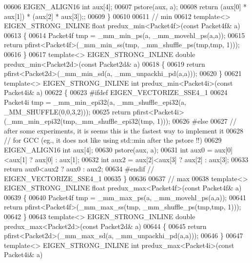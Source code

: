 \begin{DoxyCode}
00606   EIGEN\_ALIGN16 \textcolor{keywordtype}{int} aux[4];
00607   pstore(aux, a);
00608   \textcolor{keywordflow}{return}  (aux[0] * aux[1]) * (aux[2] * aux[3]);;
00609 \}
00610 
00611 \textcolor{comment}{// min}
00612 \textcolor{keyword}{template}<> EIGEN\_STRONG\_INLINE \textcolor{keywordtype}{float} predux\_min<Packet4f>(\textcolor{keyword}{const} Packet4f& a)
00613 \{
00614   Packet4f tmp = \_mm\_min\_ps(a, \_mm\_movehl\_ps(a,a));
00615   \textcolor{keywordflow}{return} pfirst<Packet4f>(\_mm\_min\_ss(tmp, \_mm\_shuffle\_ps(tmp,tmp, 1)));
00616 \}
00617 \textcolor{keyword}{template}<> EIGEN\_STRONG\_INLINE \textcolor{keywordtype}{double} predux\_min<Packet2d>(\textcolor{keyword}{const} Packet2d& a)
00618 \{
00619   \textcolor{keywordflow}{return} pfirst<Packet2d>(\_mm\_min\_sd(a, \_mm\_unpackhi\_pd(a,a)));
00620 \}
00621 \textcolor{keyword}{template}<> EIGEN\_STRONG\_INLINE \textcolor{keywordtype}{int} predux\_min<Packet4i>(\textcolor{keyword}{const} Packet4i& a)
00622 \{
00623 \textcolor{preprocessor}{#ifdef EIGEN\_VECTORIZE\_SSE4\_1}
00624   Packet4i tmp = \_mm\_min\_epi32(a, \_mm\_shuffle\_epi32(a, \_MM\_SHUFFLE(0,0,3,2)));
00625   \textcolor{keywordflow}{return} pfirst<Packet4i>(\_mm\_min\_epi32(tmp,\_mm\_shuffle\_epi32(tmp, 1)));
00626 \textcolor{preprocessor}{#else}
00627   \textcolor{comment}{// after some experiments, it is seems this is the fastest way to implement it}
00628   \textcolor{comment}{// for GCC (eg., it does not like using std::min after the pstore !!)}
00629   EIGEN\_ALIGN16 \textcolor{keywordtype}{int} aux[4];
00630   pstore(aux, a);
00631   \textcolor{keywordtype}{int} aux0 = aux[0]<aux[1] ? aux[0] : aux[1];
00632   \textcolor{keywordtype}{int} aux2 = aux[2]<aux[3] ? aux[2] : aux[3];
00633   \textcolor{keywordflow}{return} aux0<aux2 ? aux0 : aux2;
00634 \textcolor{preprocessor}{#endif // EIGEN\_VECTORIZE\_SSE4\_1}
00635 \}
00636 
00637 \textcolor{comment}{// max}
00638 \textcolor{keyword}{template}<> EIGEN\_STRONG\_INLINE \textcolor{keywordtype}{float} predux\_max<Packet4f>(\textcolor{keyword}{const} Packet4f& a)
00639 \{
00640   Packet4f tmp = \_mm\_max\_ps(a, \_mm\_movehl\_ps(a,a));
00641   \textcolor{keywordflow}{return} pfirst<Packet4f>(\_mm\_max\_ss(tmp, \_mm\_shuffle\_ps(tmp,tmp, 1)));
00642 \}
00643 \textcolor{keyword}{template}<> EIGEN\_STRONG\_INLINE \textcolor{keywordtype}{double} predux\_max<Packet2d>(\textcolor{keyword}{const} Packet2d& a)
00644 \{
00645   \textcolor{keywordflow}{return} pfirst<Packet2d>(\_mm\_max\_sd(a, \_mm\_unpackhi\_pd(a,a)));
00646 \}
00647 \textcolor{keyword}{template}<> EIGEN\_STRONG\_INLINE \textcolor{keywordtype}{int} predux\_max<Packet4i>(\textcolor{keyword}{const} Packet4i& a)

\end{DoxyCode}
